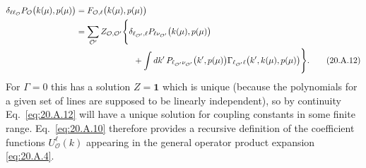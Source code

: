 \begin{align}
\delta_{\ell\ell_{\mathcal O}}
P_{\mathcal O}\bigl(k(\mu),p(\mu)\bigr)
&=F_{\mathcal O,\ell}\bigl(k(\mu),p(\mu)\bigr)
\notag\\
&=\sum_{\mathcal O'}Z_{\mathcal O,\mathcal O'}
\Bigg\{
\delta_{\ell_{\mathcal O'},\ell}
P_{\ell\nu_{\mathcal O'}}\bigl(k(\mu),p(\mu)\bigr)
\notag\\
&\hspace{24mm}
+\int dk'\,
P_{\ell_{\mathcal O'}\nu_{\mathcal O'}}\bigl(k',p(\mu)\bigr)
\Gamma_{\ell_{\mathcal O'}\ell}
\bigl(k',k(\mu),p(\mu)\bigr)
\Bigg\}.
\tag{20.A.12}\label{eq:20.A.12}
\end{align}
For $\Gamma=0$ this has a solution $Z=\mathbf{1}$ which is unique (because the polynomials for a given set of lines are supposed to be linearly independent), so by continuity Eq.~\eqref{eq:20.A.12} will have a unique solution for coupling constants in some finite range. Eq.~\eqref{eq:20.A.10} therefore provides a recursive definition of the coefficient functions $U_{\mathcal O}^{\ell}(k)$ appearing in the general operator product expansion \eqref{eq:20.A.4}.
